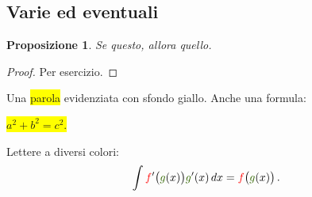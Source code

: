 \documentclass[a4,portrait,italian]{seminar}
\newcommand{\rosso}[1]{\textcolor{red}{#1}}
\newcommand{\verdescuro}[1]{\textcolor{darkgreen}{#1}}
\newcommand{\sfondogiallo}[1]{\colorbox{yellow}{#1}}
\newcommand{\displaysfondogiallo}[1]{\begin{center}%
  \sfondogiallo{$\displaystyle{#1}$}\end{center}}
\theoremstyle{Ocra}
\theoremstyle{Blu}
\newtheorem{proposizione}{Proposizione}
\theoremstyle{Verde}
\begin{document}
\begin{slide*}

\section{Varie ed eventuali}

\begin{proposizione}
Se questo, allora quello.
\end{proposizione}

\begin{proof}
Per esercizio.
\end{proof}

Una \sfondogiallo{parola} evidenziata con sfondo giallo. Anche una formula:
\displaysfondogiallo{a^2+b^2=c^2.}

Lettere a diversi colori:
\begin{equation*}
  \int \rosso{f}'\bigl(\verdescuro{g}(x)\bigr)
  \verdescuro{g}'(x)\,dx=
  \textcolor{red}{f}\bigl(\verdescuro{g}(x)\bigr)\,.
\end{equation*}

\end{slide*}

\end{document}
